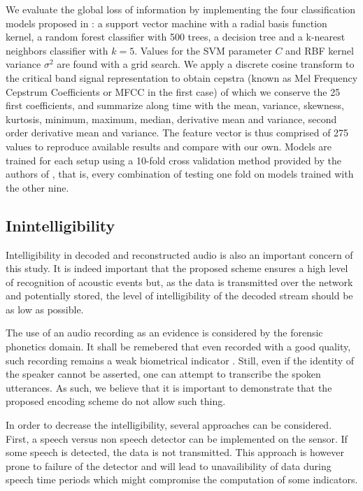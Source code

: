 \documentclass[final,3p,times,twocolumn]{elsarticle}
\begin{document}
We evaluate the global loss of information by implementing the four classification models proposed in \cite{salamon2014}: a support vector machine with a radial basis function kernel, a random forest classifier with 500 trees, a decision tree and a k-nearest neighbors classifier with $k = 5$. Values for the SVM parameter $C$ and RBF kernel variance $\sigma^2$ are found with a grid search. We apply a discrete cosine transform to the critical band signal representation to obtain cepstra (known as Mel Frequency Cepstrum Coefficients or MFCC in the first case) of which we conserve the 25 first coefficients, and summarize along time with the mean, variance, skewness, kurtosis, minimum, maximum, median, derivative mean and variance, second order derivative mean and variance. The feature vector is thus comprised of 275 values to reproduce available results and compare with our own. Models are trained for each setup using a 10-fold cross validation method provided by the authors of \cite{salamon2014}, that is, every combination of testing one fold on models trained with the other nine.

\subsection{Inintelligibility} \label{sec:inintelligibility}

Intelligibility in decoded and reconstructed audio is also an important concern of this study. It is indeed important that the proposed scheme ensures a high level of recognition of acoustic events but, as the data is transmitted over the network and potentially stored, the level of intelligibility of the decoded stream should be as low as possible.


The use of an audio recording as an evidence is considered by the forensic phonetics \cite{baldwin1990forensic} domain. It shall be remebered that even recorded with a good quality, such recording remains a weak biometrical indicator \cite{boe2000forensic}. Still, even if the identity of the speaker cannot be asserted, one can attempt to transcribe the spoken utterances. As such, we believe that it is important to demonstrate that the proposed encoding scheme do not allow such thing.

In order to decrease the intelligibility, several approaches can be considered. First,  a speech versus non speech detector can be implemented on the sensor. If some speech is detected, the data is not transmitted. This approach is however prone to failure of the detector and will lead to unavailibility of data during speech time periods which might compromise the computation of some indicators.
\end{document}
